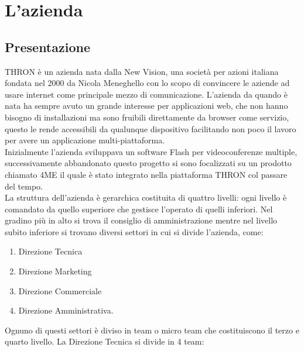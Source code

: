 \documentclass[a4paper, 12pt, twoside, openright]{book}
\begin{document}
\begingroup %
  \makeatletter
  \let\ps@plain\ps@empty
  \makeatother
  \tableofcontents
  \listoffigures
  \clearpage
\endgroup

\mainmatter

\cfoot{}
	\hypersetup{linkcolor = blue}

\chapter{L'azienda} %

\section{Presentazione}
THRON è un azienda nata dalla New Vision, una società per azioni italiana fondata nel 2000 da Nicola Meneghello con lo scopo di convincere le aziende ad usare internet come principale mezzo di comunicazione. L'azienda da quando è nata ha sempre avuto un grande interesse per applicazioni web, che non hanno bisogno di installazioni ma sono fruibili direttamente da browser come servizio, questo le rende accessibili da qualunque dispositivo facilitando non poco il lavoro per avere un applicazione multi-piattaforma.\\
Inizialmente l'azienda sviluppava un software Flash per videoconferenze multiple, successivamente abbandonato questo progetto si sono focalizzati su un prodotto chiamato 4ME il quale è stato integrato nella piattaforma THRON col passare del tempo.\\
La struttura dell'azienda è gerarchica costituita di quattro livelli: ogni livello è comandato da quello superiore che gestisce l'operato di quelli inferiori. Nel gradino più in alto si trova il consiglio di amministrazione mentre nel livello subito inferiore si trovano diversi settori in cui si divide l'azienda, come:
\begin{enumerate}
\item Direzione Tecnica
\item Direzione Marketing
\item Direzione Commerciale
\item Direzione Amministrativa.
\end{enumerate}
Ognuno di questi settori è diviso in team o micro team che costituiscono il terzo e quarto livello. La Direzione Tecnica si divide in 4 team:
\end{document}
